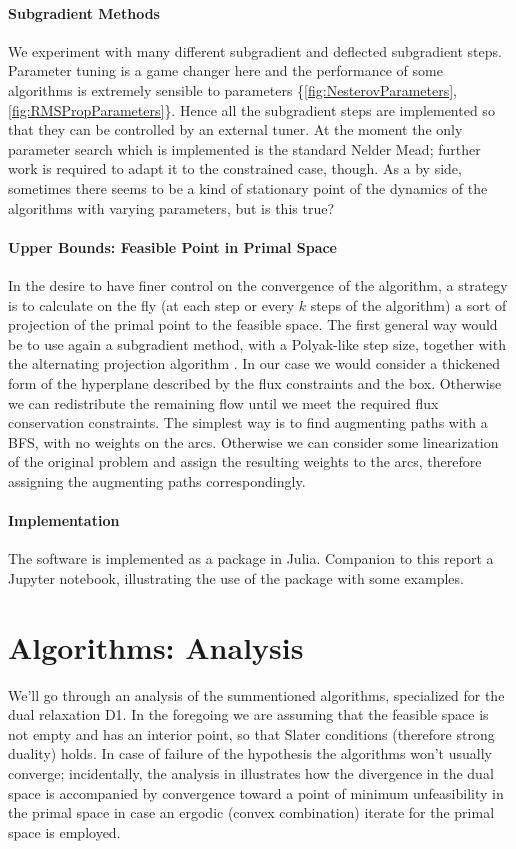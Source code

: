 \documentclass[10pt,twoside,book,a5paper]{ncc}
\begin{document}
\paragraph{Subgradient Methods} We experiment with many different subgradient and deflected subgradient steps. Parameter tuning is a game changer here and the performance of some algorithms is extremely sensible to parameters \{\ref{fig:NesterovParameters}, \ref{fig:RMSPropParameters}\}.
Hence all the subgradient steps are implemented so that they can be controlled by an external tuner. At the moment the only parameter search which is implemented is the standard Nelder Mead; further work is required to adapt it to the constrained case, though. As a by side, sometimes there seems to be a kind of stationary point of the dynamics of the algorithms with varying parameters, but is this true?
\paragraph{Upper Bounds: Feasible Point in Primal Space} In the desire to have finer control on the convergence of the algorithm, a strategy is to calculate on the fly (at each step or every $k$ steps of the algorithm) a sort of projection of the primal point to the feasible space. The first general way would be to use again a subgradient method, with a Polyak-like step size, together with the alternating projection algorithm \cite{NotesBoyd}. In our case we would consider a thickened form of the hyperplane described by the flux constraints and the box.
Otherwise we can redistribute the remaining flow until we meet the required flux conservation constraints. The simplest way is to find augmenting paths with a BFS, with no weights on the arcs. Otherwise we can consider some linearization of the original problem and assign the resulting weights to the arcs, therefore assigning the augmenting paths correspondingly.

\paragraph{Implementation}
The software is implemented as a package in Julia. Companion to this report a Jupyter notebook, illustrating the use of the package with some examples.

\section{Algorithms: Analysis}
We'll go through an analysis of the summentioned algorithms, specialized for the dual relaxation D1. In the foregoing we are assuming that the feasible space is not empty and has an interior point, so that Slater conditions (therefore strong duality) holds. In case of failure of the hypothesis the algorithms won't usually converge; incidentally, the analysis in \cite{PrimalII} illustrates how the divergence in the dual space is accompanied by convergence toward a point of minimum unfeasibility in the primal space in case an ergodic (convex combination) iterate for the primal space is employed.
\end{document}
